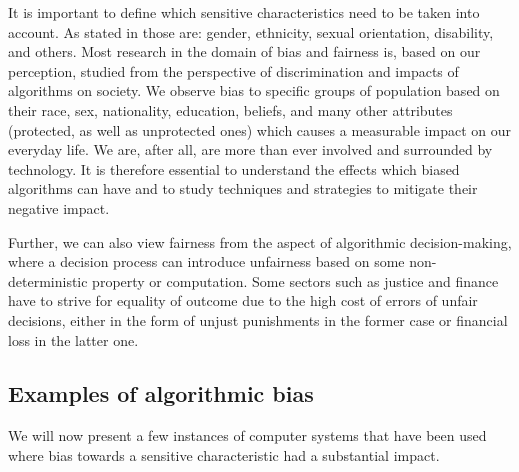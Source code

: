 It is important to define which sensitive characteristics need to be taken into account. As stated in \cite{european-union-agency-for-fundamental-rights-2018} those are: gender, ethnicity, sexual orientation, disability, and others. Most research in the domain of bias and fairness is, based on our perception, studied from the perspective of discrimination and impacts of algorithms on society. We observe bias to specific groups of population based on their race, sex, nationality, education, beliefs, and many other attributes (protected, as well as unprotected ones) which causes a measurable impact on our everyday life. We are, after all, are more than ever involved and surrounded by technology. It is therefore essential to understand the effects which biased algorithms can have and to study techniques and strategies to mitigate their negative impact.

Further, we can also view fairness from the aspect of algorithmic decision-making, where a decision process can introduce unfairness based on some non-deterministic property or computation. Some sectors such as justice and finance have to strive for equality of outcome due to the high cost of errors of unfair decisions, either in the form of unjust punishments in the former case or financial loss in the latter one.


\subsection{Examples of algorithmic bias}\label{subsec:02_algo_fairness.examples_of_algo_biass}
We will now present a few instances of computer systems that have been used where bias towards a sensitive characteristic had a substantial impact.


